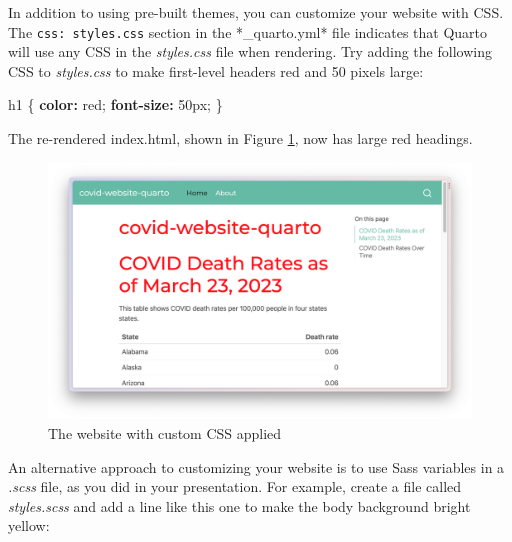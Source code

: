 \documentclass[
]{book}
\newenvironment{Shaded}{\begin{snugshade}}{\end{snugshade}}
\newcommand{\AttributeTok}[1]{\textcolor[rgb]{0.13,0.29,0.53}{#1}}
\newcommand{\FunctionTok}[1]{\textcolor[rgb]{0.13,0.29,0.53}{\textbf{#1}}}
\newcommand{\KeywordTok}[1]{\textcolor[rgb]{0.13,0.29,0.53}{\textbf{#1}}}
\begin{document}
In addition to using pre-built themes, you can customize your website with CSS. The \texttt{css:\ styles.css} section in the *\_quarto.yml* file indicates that Quarto will use any CSS in the \emph{styles.css} file when rendering. Try adding the following CSS to \emph{styles.css} to make first-level headers red and 50 pixels large:

\begin{Shaded}
\begin{Highlighting}[]
\AttributeTok{h1 \{}
\AttributeTok{    }\FunctionTok{color}\KeywordTok{:}\AttributeTok{ red;}
\AttributeTok{  }\FunctionTok{font{-}size}\KeywordTok{:}\AttributeTok{ 50px;}
\AttributeTok{\}}
\end{Highlighting}
\end{Shaded}

The re-rendered index.html, shown in Figure \ref{fig:covid-website-custom-css}, now has large red headings.

\begin{figure}
\includegraphics[width=1\linewidth]{assets/covid-website-custom-css} \caption{The website with custom CSS applied}\label{fig:covid-website-custom-css}
\end{figure}

An alternative approach to customizing your website is to use Sass variables in a \emph{.scss} file, as you did in your presentation. For example, create a file called \emph{styles.scss} and add a line like this one to make the body background bright yellow:

\begin{Shaded}
\end{Shaded}
\end{document}

